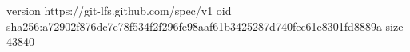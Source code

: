 version https://git-lfs.github.com/spec/v1
oid sha256:a72902f876dc7e78f534f2f296fe98aaf61b3425287d740fec61e8301fd8889a
size 43840
